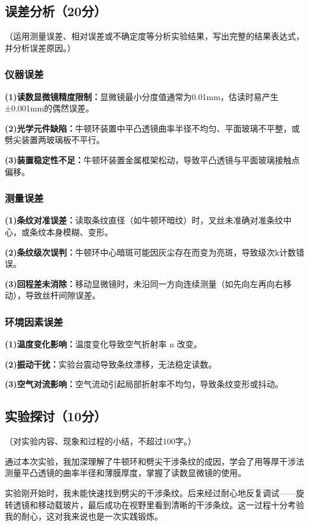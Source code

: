\documentclass[]{../../templates/Report}%
\begin{document}
\begin{fullreportonly}
\subsection{误差分析（20分）}
（运用测量误差、相对误差或不确定度等分析实验结果，写出完整的结果表达式，并分析误差原因。）
\subsubsection{仪器误差}
\textbf{(1)读数显微镜精度限制：}显微镜最小分度值通常为0.01mm，估读时易产生±0.001mm的偶然误差。
\par
\textbf{(2)光学元件缺陷：}牛顿环装置中平凸透镜曲率半径不均匀、平面玻璃不平整，或劈尖装置两玻璃板不平行。
\par
\textbf{(3)装置稳定性不足：}牛顿环装置金属框架松动，导致平凸透镜与平面玻璃接触点偏移。

\subsubsection{测量误差}
\textbf{(1)条纹对准误差：}读取条纹直径（如牛顿环暗纹）时，叉丝未准确对准条纹中心，或条纹本身模糊、变形。
\par
\textbf{(2)条纹级次误判：}牛顿环中心暗斑可能因灰尘存在而变为亮斑，导致级次k计数错误。
\par
\textbf{(3)回程差未消除：}移动显微镜时，未沿同一方向连续测量（如先向左再向右移动），导致丝杆间隙误差。

\subsubsection{环境因素误差}
\textbf{(1)温度变化影响：}温度变化导致空气折射率 n 改变。
\par
\textbf{(2)振动干扰：}实验台震动导致条纹漂移，无法稳定读数。
\par
\textbf{(3)空气对流影响：}空气流动引起局部折射率不均匀，导致条纹变形或抖动。


\subsection{实验探讨（10分）}
（对实验内容、现象和过程的小结，不超过100字。）
\par
通过本次实验，我加深理解了牛顿环和劈尖干涉条纹的成因，学会了用等厚干涉法测量平凸透镜的曲率半径和薄膜厚度，掌握了读数显微镜的使用。
\par
实验刚开始时，我未能快速找到劈尖的干涉条纹。后来经过耐心地反复调试——旋转透镜和移动载玻片，最后成功在视野里看到清晰的干涉条纹。这一过程十分考验我的耐心，这对我来说也是一次实践锻炼。


\end{fullreportonly}
\end{document}
